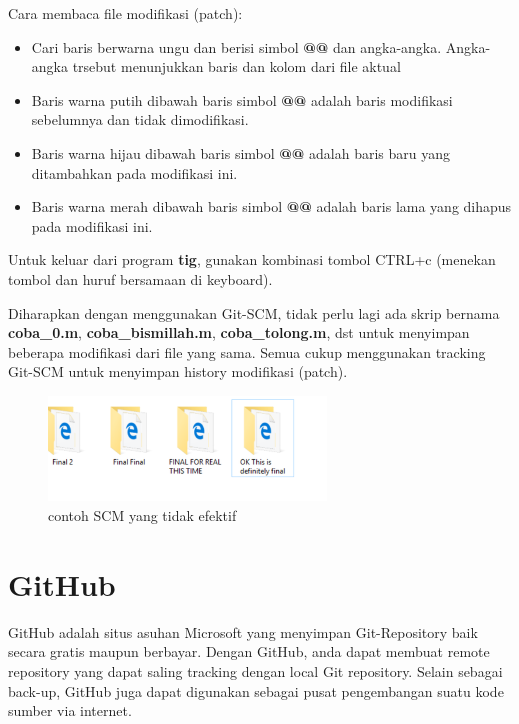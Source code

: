 \documentclass[12pt]{book}
\begin{document}
	Cara membaca file modifikasi (patch):
	\begin{itemize}
		\item Cari baris berwarna ungu dan berisi simbol \textbf{@@} dan angka-angka.
		Angka-angka trsebut menunjukkan baris dan kolom dari file aktual
		
		\item Baris warna putih dibawah baris simbol \textbf{@@} adalah baris modifikasi sebelumnya dan tidak dimodifikasi.
		
		\item Baris warna hijau dibawah baris simbol \textbf{@@} adalah baris baru yang ditambahkan pada modifikasi ini.
		
		\item Baris warna merah dibawah baris simbol \textbf{@@} adalah baris lama yang dihapus pada modifikasi ini.
	\end{itemize}

	Untuk keluar dari program \textbf{tig}, gunakan kombinasi tombol CTRL+c (menekan tombol  dan huruf  bersamaan di keyboard).

	Diharapkan dengan menggunakan Git-SCM, tidak perlu lagi ada skrip bernama \textbf{coba\_0.m}, \textbf{coba\_bismillah.m}, \textbf{coba\_tolong.m}, dst
	untuk menyimpan beberapa modifikasi dari file yang sama.
	Semua cukup menggunakan tracking Git-SCM untuk menyimpan history modifikasi (patch).
	
	\begin{figure}[!ht]
		\centering
		\includegraphics[width=210pt]{images/memescm}
		\caption{contoh SCM yang tidak efektif}
	\end{figure}
	
	\newpage
	\section{GitHub}
	
	GitHub adalah situs asuhan Microsoft yang menyimpan Git-Repository baik secara gratis maupun berbayar.
	Dengan GitHub, anda dapat membuat remote repository yang dapat saling tracking dengan local Git repository.
	Selain sebagai back-up, GitHub juga dapat digunakan sebagai pusat pengembangan suatu kode sumber via internet.
	
\end{document}
